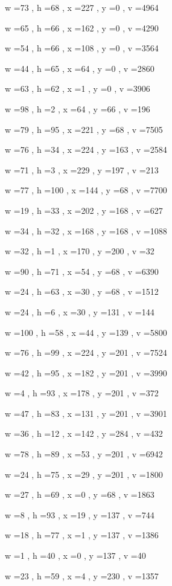 \documentclass[11pt]{article}
\begin{document}
w =73 , h =68 , x =227 , y =0 , v =4964
\par
w =65 , h =66 , x =162 , y =0 , v =4290
\par
w =54 , h =66 , x =108 , y =0 , v =3564
\par
w =44 , h =65 , x =64 , y =0 , v =2860
\par
w =63 , h =62 , x =1 , y =0 , v =3906
\par
w =98 , h =2 , x =64 , y =66 , v =196
\par
w =79 , h =95 , x =221 , y =68 , v =7505
\par
w =76 , h =34 , x =224 , y =163 , v =2584
\par
w =71 , h =3 , x =229 , y =197 , v =213
\par
w =77 , h =100 , x =144 , y =68 , v =7700
\par
w =19 , h =33 , x =202 , y =168 , v =627
\par
w =34 , h =32 , x =168 , y =168 , v =1088
\par
w =32 , h =1 , x =170 , y =200 , v =32
\par
w =90 , h =71 , x =54 , y =68 , v =6390
\par
w =24 , h =63 , x =30 , y =68 , v =1512
\par
w =24 , h =6 , x =30 , y =131 , v =144
\par
w =100 , h =58 , x =44 , y =139 , v =5800
\par
w =76 , h =99 , x =224 , y =201 , v =7524
\par
w =42 , h =95 , x =182 , y =201 , v =3990
\par
w =4 , h =93 , x =178 , y =201 , v =372
\par
w =47 , h =83 , x =131 , y =201 , v =3901
\par
w =36 , h =12 , x =142 , y =284 , v =432
\par
w =78 , h =89 , x =53 , y =201 , v =6942
\par
w =24 , h =75 , x =29 , y =201 , v =1800
\par
w =27 , h =69 , x =0 , y =68 , v =1863
\par
w =8 , h =93 , x =19 , y =137 , v =744
\par
w =18 , h =77 , x =1 , y =137 , v =1386
\par
w =1 , h =40 , x =0 , y =137 , v =40
\par
w =23 , h =59 , x =4 , y =230 , v =1357
\par
\newpage
\end{document}
